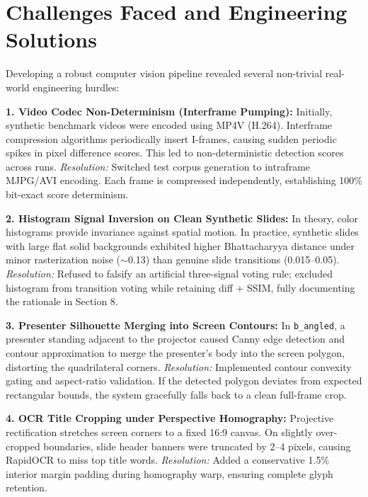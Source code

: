 \documentclass[10pt,a4paper]{article}
\begin{document}
\section{Challenges Faced and Engineering Solutions}

Developing a robust computer vision pipeline revealed several non-trivial real-world engineering hurdles:

\textbf{1. Video Codec Non-Determinism (Interframe Pumping):} Initially, synthetic benchmark videos were encoded using MP4V (H.264). Interframe compression algorithms periodically insert I-frames, causing sudden periodic spikes in pixel difference scores. This led to non-deterministic detection scores across runs. \textit{Resolution:} Switched test corpus generation to intraframe MJPG/AVI encoding. Each frame is compressed independently, establishing 100\% bit-exact score determinism.

\textbf{2. Histogram Signal Inversion on Clean Synthetic Slides:} In theory, color histograms provide invariance against spatial motion. In practice, synthetic slides with large flat solid backgrounds exhibited higher Bhattacharyya distance under minor rasterization noise ($\sim$0.13) than genuine slide transitions (0.015–0.05). \textit{Resolution:} Refused to falsify an artificial three-signal voting rule; excluded histogram from transition voting while retaining diff + SSIM, fully documenting the rationale in Section 8.

\textbf{3. Presenter Silhouette Merging into Screen Contours:} In \texttt{b\_angled}, a presenter standing adjacent to the projector caused Canny edge detection and contour approximation to merge the presenter's body into the screen polygon, distorting the quadrilateral corners. \textit{Resolution:} Implemented contour convexity gating and aspect-ratio validation. If the detected polygon deviates from expected rectangular bounds, the system gracefully falls back to a clean full-frame crop.

\textbf{4. OCR Title Cropping under Perspective Homography:} Projective rectification stretches screen corners to a fixed 16:9 canvas. On slightly over-cropped boundaries, slide header banners were truncated by 2–4 pixels, causing RapidOCR to miss top title words. \textit{Resolution:} Added a conservative 1.5\% interior margin padding during homography warp, ensuring complete glyph retention.

\end{document}
